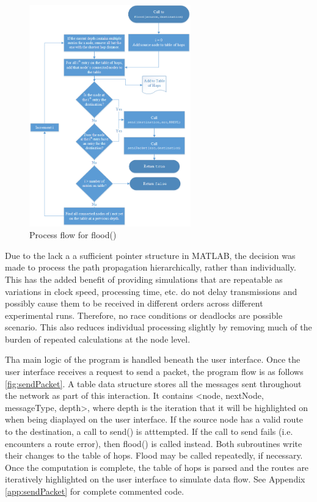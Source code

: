 \documentclass[conference]{IEEEtran}
\begin{document}
\begin{figure}
	\centering
	\includegraphics[width=2.75in]{flood.png}
	\caption{Process flow for flood()}
	\label{fig:flood}
\end{figure}

Due to the lack a a sufficient pointer structure in MATLAB, the decision was made to process the path propagation hierarchically, rather than individually. This has the added benefit of providing simulations that are repeatable as variations in clock speed, processing time, etc. do not delay transmissions and possibly cause them to be received in different orders across different experimental runs. Therefore, no race conditions or deadlocks are possible scenario. This also reduces individual processing slightly by removing much of the burden of repeated calculations at the node level.

Tha main logic of the program is handled beneath the user interface. Once the user interface receives a request to send a packet, the program flow is as follows \ref{fig:sendPacket}. A table data structure stores all the messages sent throughout the network as part of this interaction. It contains <node, nextNode, messageType, depth>, where depth is the iteration that it will be highlighted on when being diaplayed on the user interface. If the source node has a valid route to the destination, a call to send() is atttempted. If the call to send fails (i.e. encounters a route error), then flood() is called instead. Both subroutines write their changes to the table of hops. Flood may be called repeatedly, if necessary. Once the computation is complete, the table of hops is parsed and the routes are iteratively highlighted on the user interface to simulate data flow. See Appendix \ref{app:sendPacket} for complete commented code.
\end{document}
